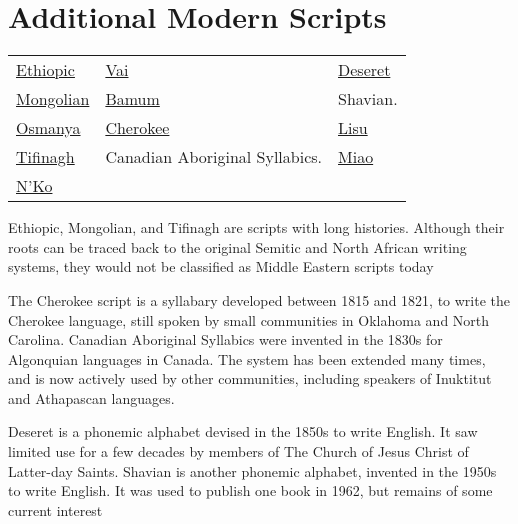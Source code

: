 \chapter{Additional Modern Scripts}

\begin{center}
\begin{tabular}{lp{5cm}l}
\hyperref[s:ethiopic]{Ethiopic}
&\hyperref[s:vai]{Vai}
& \hyperref[s:deseret]{Deseret}\\
\hyperref[s:mongolian]{Mongolian} 
&\hyperref[s:bamum]{Bamum} &Shavian.\\
\hyperref[s:osmanya]{Osmanya}
& \hyperref[s:cherokee]{Cherokee} 
& \hyperref[s:lisu]{Lisu}\\
\hyperref[s:tifinagh]{Tifinagh}
&Canadian Aboriginal Syllabics. 
&\hyperref[s:miao]{Miao}\\
\hyperref[s:nko]{N’Ko}&&\\
\end{tabular}
\end{center}

Ethiopic, Mongolian, and Tifinagh are scripts with long histories. Although their roots can
be traced back to the original Semitic and North African writing systems, they would not
be classified as Middle Eastern scripts today

The Cherokee script is a syllabary developed between 1815 and 1821, to write the Cherokee
language, still spoken by small communities in Oklahoma and North Carolina. Canadian
Aboriginal Syllabics were invented in the 1830s for Algonquian languages in Canada. The
system has been extended many times, and is now actively used by other communities, including speakers of Inuktitut and Athapascan languages.

Deseret is a phonemic alphabet devised in the 1850s to write English. It saw limited use for
a few decades by members of The Church of Jesus Christ of Latter-day Saints. Shavian is
another phonemic alphabet, invented in the 1950s to write English. It was used to publish
one book in 1962, but remains of some current interest















